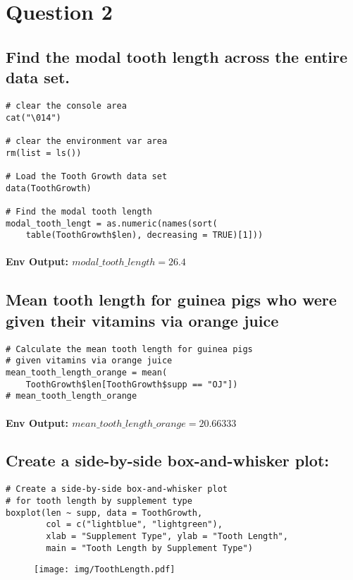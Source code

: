 \section{Question 2}
\subsection{Find the modal tooth length across the entire data set.}
\begin{lstlisting}[style=rstyle]
# clear the console area
cat("\014")

# clear the environment var area
rm(list = ls())

# Load the Tooth Growth data set
data(ToothGrowth)

# Find the modal tooth length
modal_tooth_lengt = as.numeric(names(sort(
    table(ToothGrowth$len), decreasing = TRUE)[1]))
\end{lstlisting}
\paragraph{Env Output: $modal\_tooth\_length=26.4$}
\subsection{Mean tooth length for guinea pigs who were given their vitamins via orange juice}
% 
\begin{lstlisting}[style=rstyle]
# Calculate the mean tooth length for guinea pigs 
# given vitamins via orange juice
mean_tooth_length_orange = mean(
    ToothGrowth$len[ToothGrowth$supp == "OJ"])
# mean_tooth_length_orange    
\end{lstlisting}
\paragraph{Env Output: $mean\_tooth\_length\_orange=20.66333$}
% 
\subsection{Create a side-by-side box-and-whisker plot:}
% 
\begin{lstlisting}[style=rstyle]
# Create a side-by-side box-and-whisker plot
# for tooth length by supplement type
boxplot(len ~ supp, data = ToothGrowth, 
        col = c("lightblue", "lightgreen"),
        xlab = "Supplement Type", ylab = "Tooth Length",
        main = "Tooth Length by Supplement Type")
\end{lstlisting}
% 
% 
\begin{figure}[H]
    \centering
    \texttt{[image: img/ToothLength.pdf]}
\end{figure}
% 
% 

